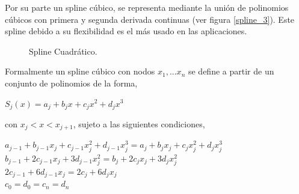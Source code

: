 \hspace{0.4cm} Por su parte un spline c\'ubico, se representa mediante la uni\'on de polinomios c\'ubicos con primera y segunda derivada continuas (ver figura \ref{spline_3}). Este spline debido a su flexibilidad es el m\'as usado en las aplicaciones.

\vspace{0.5cm}

\begin{figure}[h]
\caption{Spline Cuadr\'atico.}
\label{spline_c}
\end{figure}


\hspace{0.4cm}Formalmente un spline c\'ubico con nodos $x_{1},...x_{n}$ se define a partir de un conjunto de polinomios de la forma,\\

\begin{center}

$\displaystyle{S_{j}(x) = a_{j} + b_{j}x +c_{j}x^2 +d_{j}x^3}$
\end{center}


\vspace{0.5cm}

\noindent con $x_{j}<x<x_{j+1}$, sujeto a las siguientes condiciones,\\


\begin{center}

$\displaystyle{a_{j-1} + b_{j-1}x_{j} +c_{j-1}x_{j}^2 +d_{j-1}x_{j}^3 = a_{j} + b_{j}x_{j} +c_{j}x_{j}^2 +d_{j}x_{j}^3}$\\
$\displaystyle{ b_{j-1} +2c_{j-1}x_{j} +3d_{j-1}x_{j}^2 = b_{j} +2c_{j}x_{j} +3d_{j}x_{j}^2}$\\
$\displaystyle{ 2c_{j-1} +6d_{j-1}x_{j} = 2c_{j} +6d_{j}x_{j}}$\\
$\displaystyle{ c_{0} = d_{0} = c_{n} =d_{n}}$

\end{center}


